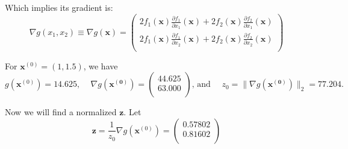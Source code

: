 \documentclass[12pt]{article}
\begin{document}
Which implies its gradient is:
\begin{equation}
  \label{eq:stp_nabg}
  \nabla g(x_1,x_2) \equiv \nabla g(\mathbf{x}) = 
  \begin{pmatrix}
    2f_1(\mathbf{x})\frac{\partial f_1}{\partial x_1}(\mathbf{x}) + 2f_2(\mathbf{x})\frac{\partial f_2}{\partial x_1}(\mathbf{x}) \\
    2f_1(\mathbf{x})\frac{\partial f_1}{\partial x_2}(\mathbf{x}) + 2f_2(\mathbf{x})\frac{\partial f_2}{\partial x_2}(\mathbf{x}) \\
  \end{pmatrix}
\end{equation}

For $\mathbf{x}^{(0)}=(1,1.5)$, we have 
\begin{equation*}
  g(\mathbf{x}^{(0)}) = 14.625 \text{, } \quad
  \nabla g(\mathbf{x^{(0)}}) =
  \begin{pmatrix}
    44.625 \\
    63.000 \\
  \end{pmatrix} \text{, and } \quad
  z_0=\|\nabla g(\mathbf{x^{(0)}})\|_2 = 77.204
.
\end{equation*}

Now we will find a normalized $\mathbf{z}$. Let
\begin{equation*}
  \mathbf{z} = \frac{1}{z_0}\nabla g(\textbf{x}^{(0)}) = 
  \begin{pmatrix}
    0.57802 \\
    0.81602 \\
  \end{pmatrix}
\end{equation*}
\end{document}
